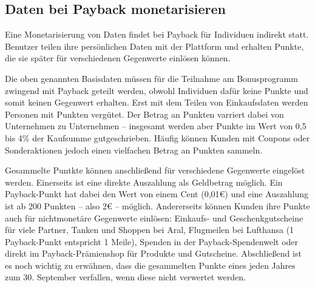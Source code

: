 \subsection{Daten bei Payback monetarisieren}
Eine Monetarisierung von Daten findet bei Payback für Individuen indirekt statt. Benutzer teilen ihre persönlichen Daten mit der Plattform und erhalten Punkte, die sie später für verschiedenen Gegenwerte einlösen können. \newline

\noindent Die oben genannten Basisdaten müssen für die Teilnahme am Bonusprogramm zwingend mit Payback geteilt werden, obwohl Individuen dafür keine Punkte und somit keinen Gegenwert erhalten. Erst mit dem Teilen von Einkaufsdaten werden Personen mit Punkten vergütet. Der Betrag an Punkten varriert dabei von Unternehmen zu Unternehmen -- insgesamt werden aber Punkte im Wert von 0,5 bis 4\% der Kaufsumme gutgeschrieben. Häufig können Kunden mit Coupons oder Sonderaktionen jedoch einen vielfachen Betrag an Punkten sammeln. \newline

\noindent Gesammelte Puntkte können anschließend für verschiedene Gegenwerte eingelöst werden. Einerseits ist eine direkte Auszahlung als Geldbetrag möglich. Ein Payback-Punkt hat dabei den Wert von einem Cent (0,01€) und eine Auszahlung ist ab 200 Punkten -- also 2€ -- möglich. \cite{Payback_Teilnahme} Andererseits können Kunden ihre Punkte auch für nichtmonetäre Gegenwerte einlösen: Einkaufs- und Geschenkgutscheine für viele Partner, Tanken und Shoppen bei Aral, Flugmeilen bei Lufthansa (1 Payback-Punkt entspricht 1 Meile), Spenden in der Payback-Spendenwelt oder direkt im Payback-Prämienshop für Produkte und Gutscheine. \cite{Payback_Einlösen} Abschließend ist es noch wichtig zu erwähnen, dass die gesammelten Punkte eines jeden Jahres zum 30. September verfallen, wenn diese nicht verwertet werden. \cite{Payback_Teilnahme}